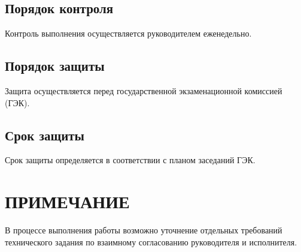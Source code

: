 \documentclass[12pt, left=30mm, right=15mm, top=20mm, bottom=20mm]{templateReportBMSTU}
\begin{document}
	\subsection{Порядок контроля}
	Контроль выполнения осуществляется руководителем еженедельно.

	\subsection{Порядок защиты}
	Защита осуществляется перед государственной экзаменационной комиссией (ГЭК).
	
	\subsection{Срок защиты}
	Срок защиты определяется в соответствии с планом заседаний ГЭК.

	\section{ПРИМЕЧАНИЕ}
	В процессе выполнения работы возможно уточнение отдельных требований технического задания по взаимному согласованию руководителя и исполнителя.
\end{document}
